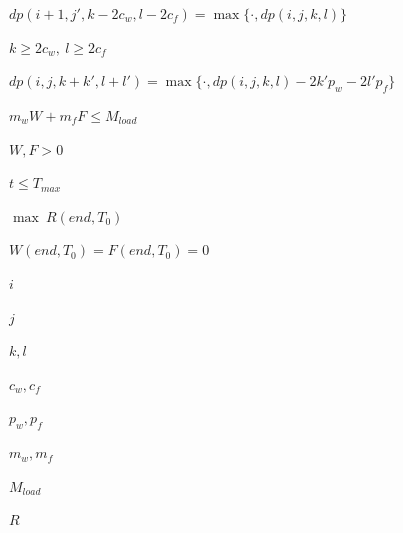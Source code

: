 
$dp(i+1,j',k-2c_w,l-2c_f)=\max\{\cdot,dp(i,j,k,l)\}$

$k\ge2c_w,\ l\ge2c_f$

$dp(i,j,k+k',l+l')=\max\{\cdot,dp(i,j,k,l)-2k'p_w-2l'p_f\}$

$m_w W+m_f F\le M_{load}$

$W,F>0$

$t\le T_{max}$

$\max\ R(end,T_0)$

$W(end,T_0)=F(end,T_0)=0$

$i$

$j$

$k,l$

$c_w,c_f$

$p_w,p_f$

$m_w,m_f$

$M_{load}$

$R$
